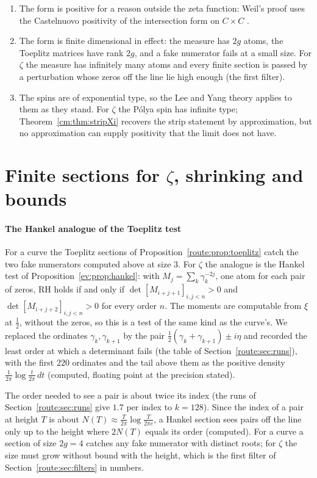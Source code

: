 \begin{enumerate}
\item The form is positive for a reason outside the zeta function: Weil's proof uses the Castelnuovo positivity of the intersection form on $C\times C$ \cite{Weil48}.
\item The form is finite dimensional in effect: the measure has $2g$ atoms, the Toeplitz matrices have rank $2g$, and a fake numerator fails at a small size. For $\zeta$ the measure has infinitely many atoms and every finite section is passed by a perturbation whose zeros off the line lie high enough (the first filter).
\item The spins are of exponential type, so the Lee and Yang theory applies to them as they stand. For $\zeta$ the P\'olya spin has infinite type; Theorem~\ref{cm:thm:stripXi} recovers the strip statement by approximation, but no approximation can supply positivity that the limit does not have.
\end{enumerate}

\section{Finite sections for \texorpdfstring{$\zeta$}{zeta}, shrinking and bounds}\label{route:sec:round2}



\paragraph{The Hankel analogue of the Toeplitz test} For a curve the Toeplitz sections of Proposition~\ref{route:prop:toeplitz} catch the two fake numerators computed above at size $3$. For $\zeta$ the analogue is the Hankel test of Proposition~\ref{ev:prop:hankel}: with $M_j=\sum_k\gamma_k^{-2j}$, one atom for each pair of zeros, RH holds if and only if $\det[M_{i+j+1}]_{i,j<n}>0$ and $\det[M_{i+j+2}]_{i,j<n}>0$ for every order $n$. The moments are computable from $\xi$ at $\frac12$, without the zeros, so this is a test of the same kind as the curve's. We replaced the ordinates $\gamma_k,\gamma_{k+1}$ by the pair $\frac12(\gamma_k+\gamma_{k+1})\pm i\eta$ and recorded the least order at which a determinant fails (the table of Section~\ref{route:sec:runs}), with the first $220$ ordinates and the tail above them as the positive density $\frac1{2\pi}\log\frac t{2\pi}\,dt$ (computed, floating point at the precision stated).


The order needed to see a pair is about twice its index (the runs of Section~\ref{route:sec:runs} give $1.7$ per index to $k=128$). Since the index of a pair at height $T$ is about $N(T)\approx\frac T{2\pi}\log\frac T{2\pi e}$, a Hankel section sees pairs off the line only up to the height where $2N(T)$ equals its order (computed). For a curve a section of size $2g=4$ catches any fake numerator with distinct roots; for $\zeta$ the size must grow without bound with the height, which is the first filter of Section~\ref{route:sec:filters} in numbers.

